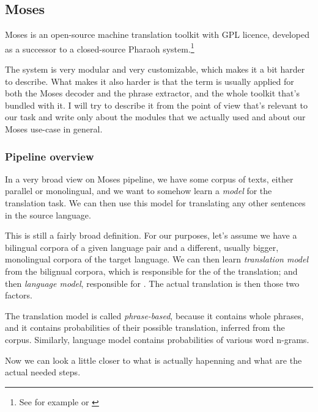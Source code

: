 \subsection{Moses}
\label{moses}
Moses is an open-source machine translation toolkit with GPL licence, developed as a successor to a closed-source Pharaoh system.\footnote{See for example \cite{mosespaper} or \cite{moseslink}}

The system is very modular and very customizable, which makes it a bit harder to describe. What makes it also harder is that the term  is usually applied for both the  Moses decoder and the phrase extractor, and the whole toolkit that's bundled with it. I will try to describe it from the point of view that's relevant to our task and write only about the modules that we actually used and about our Moses use-case in general.



\subsubsection{Pipeline overview}
In a very broad view on Moses pipeline, we have some corpus of texts, either parallel or monolingual, and we want to somehow learn a \emph{model} for the translation task. We can then use this model for translating any other sentences in the source language.

This is still a fairly broad definition. For our purposes, let's assume we have a bilingual corpora of a given language pair and a different, usually bigger, monolingual corpora of the target language. We can then learn \emph{translation model} from the bilignual corpora, which is responsible for the  of the translation; and then \emph{language model}, responsible for . The actual translation is then  those two factors.

The translation model is called \emph{phrase-based}, because it contains whole phrases, and it contains probabilities of their possible translation, inferred from the corpus. 
Similarly, language model contains probabilities of various word n-grams. 

Now we can look a little closer to what is actually hapenning and what are the actual needed steps.

